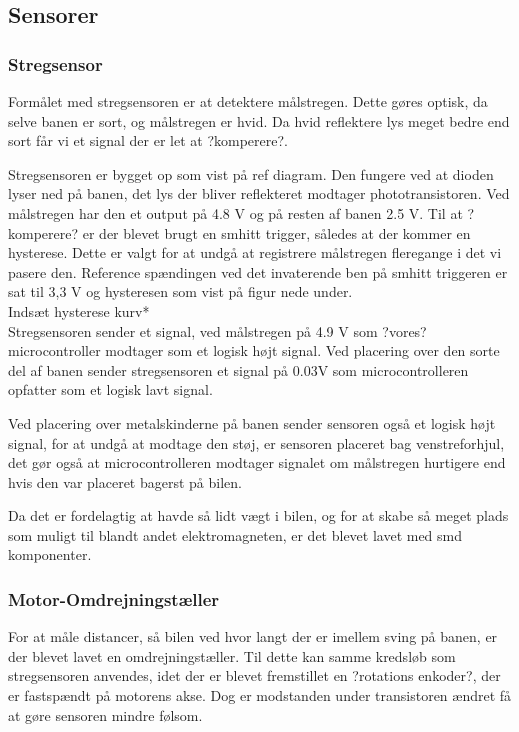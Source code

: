 
\subsection{Sensorer}


\subsubsection{Stregsensor}
Formålet med stregsensoren er at detektere målstregen. Dette gøres optisk, da selve banen er sort, og målstregen er hvid. Da hvid reflektere lys meget bedre end sort får vi et signal der er let at ?komperere?.

Stregsensoren er bygget op som vist på ref diagram. Den fungere ved at dioden lyser ned på banen, det lys der bliver reflekteret modtager phototransistoren. Ved målstregen har den et output på 4.8 V og på resten af banen 2.5 V. Til at ?komperere? er der blevet brugt en smhitt trigger, således at der kommer en hysterese. Dette er valgt for at undgå at registrere målstregen fleregange i det vi pasere den. Reference spændingen ved det invaterende ben på smhitt triggeren er sat til 3,3 V og hysteresen som vist på figur nede under.
\\
Indsæt hysterese kurv*
\\
Stregsensoren sender et signal, ved målstregen på 4.9 V som ?vores? microcontroller modtager som et logisk højt signal. Ved placering over den sorte del af banen sender stregsensoren et signal på 0.03V som microcontrolleren opfatter som et logisk lavt signal. 

Ved placering over metalskinderne på banen sender sensoren også et logisk højt signal, for at undgå at modtage den støj, er sensoren placeret bag venstreforhjul, det gør også at microcontrolleren modtager signalet om målstregen hurtigere end hvis den var placeret bagerst på bilen. 

Da det er fordelagtig at havde så lidt vægt i bilen, og for at skabe så meget plads som muligt til blandt andet elektromagneten, er det blevet lavet med smd komponenter. 


\subsubsection{Motor-Omdrejningstæller}

For at måle distancer, så bilen ved hvor langt der er imellem sving på banen, er der blevet lavet en omdrejningstæller. Til dette kan samme kredsløb som stregsensoren anvendes, idet der er blevet fremstillet en ?rotations enkoder?, der er fastspændt på motorens akse. Dog er modstanden under transistoren ændret få at gøre sensoren mindre følsom.   

